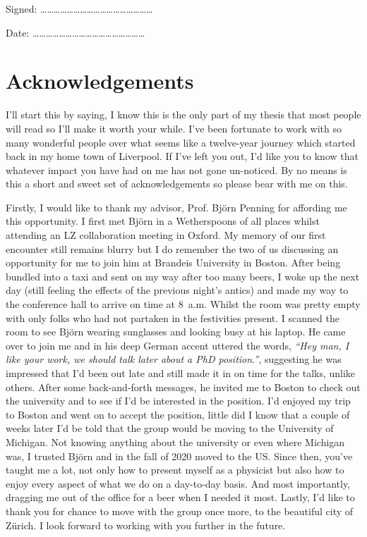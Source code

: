 \documentclass[a4paper,11pt,usegeometry]{scrreprt} %
\begin{document}
Signed:
……………………………………………
\bigskip

Date:
……………………………………………

\newpage\null\thispagestyle{empty}\newpage
\chapter*{Acknowledgements}
I'll start this by saying, I know this is the only part of my thesis that most people will read so I'll make it worth your while. I've been fortunate to work with so many wonderful people over what seems like a twelve-year journey which started back in my home town of Liverpool. If I've left you out, I'd like you to know that whatever impact you have had on me has not gone un-noticed. By no means is this a short and sweet set of acknowledgements so please bear with me on this.

Firstly, I would like to thank my advisor, Prof. Bj\"orn Penning for affording me this opportunity. I first met Bj\"orn in a Wetherspoons of all places whilst attending an LZ collaboration meeting in Oxford. My memory of our first encounter still remains blurry but I do remember the two of us discussing an opportunity for me to join him at Brandeis University in Boston. After being bundled into a taxi and sent on my way after too many beers, I woke up the next day (still feeling the effects of the previous night's antics) and made my way to the conference hall to arrive on time at 8~a.m. Whilst the room was pretty empty with only folks who had not partaken in the festivities present. I scanned the room to see Bj\"orn wearing sunglasses and looking busy at his laptop. He came over to join me and in his deep German accent uttered the words, \textit{``Hey man, I like your work, we should talk later about a PhD position.''}, suggesting he was impressed that I’d been out late and still made it in on time for the talks, unlike others. After some back-and-forth messages, he invited me to Boston to check out the university and to see if I'd be interested in the position. I'd enjoyed my trip to Boston and went on to accept the position, little did I know that a couple of weeks later I'd be told that the group would be moving to the University of Michigan. Not knowing anything about the university or even where Michigan was, I trusted Bj\"orn and in the fall of 2020 moved to the US. Since then, you've taught me a lot, not only how to present myself as a physicist but also how to enjoy every aspect of what we do on a day-to-day basis. And most importantly, dragging me out of the office for a beer when I needed it most. Lastly, I'd like to thank you for chance to move with the group once more, to the beautiful city of Z\"urich. I look forward to working with you further in the future.
\end{document}
